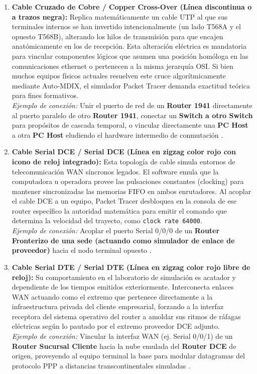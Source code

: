 \documentclass[a4paper,12pt]{article}
\begin{document}
\begin{enumerate}
    \item \textbf{Cable Cruzado de Cobre / Copper Cross-Over (Línea discontinua o a trazos negra):}
    Replica matemáticamente un cable UTP al que sus terminales internos se han invertido intencionalmente (un lado T568A y el opuesto T568B), alterando los hilos de transmisión para que encajen anatómicamente en los de recepción. Esta alteración eléctrica es mandatoria para vincular componentes lógicos que asumen una posición homóloga en las comunicaciones ethernet o pertenecen a la misma jerarquía OSI. Si bien muchos equipos físicos actuales resuelven este cruce algorítmicamente mediante Auto-MDIX, el simulador Packet Tracer demanda exactitud teórica para fines formativos. \\
    \textit{Ejemplo de conexión:} Unir el puerto de red de un \textbf{Router 1941} directamente al puerto paralelo de otro \textbf{Router 1941}, conectar un \textbf{Switch a otro Switch} para propósitos de cascada temporal, o vincular directamente una \textbf{PC Host} a otra \textbf{PC Host} eludiendo el hardware intermedio de conmutación \cite{packet_tracer_cables_guide, cisco_packet_tracer_video}.

    \item \textbf{Cable Serial DCE / Serial DCE (Línea en zigzag color rojo con icono de reloj integrado):}
    Esta topología de cable simula entornos de telecomunicación WAN síncronos legados. El software emula que la computadora u operadora provee las pulsaciones constantes (clocking) para mantener sincronizadas las memorias FIFO en ambos enrutadores. Al acoplar el cable DCE a un equipo, Packet Tracer desbloquea en la consola de ese router específico la autoridad matemática para emitir el comando que determina la velocidad del trayecto, como \texttt{clock rate 64000}. \\
    \textit{Ejemplo de conexión:} Acoplar el puerto Serial 0/0/0 de un \textbf{Router Fronterizo de una sede (actuando como simulador de enlace de proveedor)} hacia el nodo terminal opuesto \cite{dte_dce_packet_tracer}.

    \item \textbf{Cable Serial DTE / Serial DTE (Línea en zigzag color rojo libre de reloj):}
    Su comportamiento en el laboratorio de simulación es acatador y dependiente de los tiempos emitidos exteriormente. Interconecta enlaces WAN actuando como el extremo que pertenece directamente a la infraestructura privada del cliente empresarial, forzando a la interfaz receptora del sistema operativo del router a amoldar sus ritmos de ráfagas eléctricas según lo pautado por el extremo proveedor DCE adjunto. \\
    \textit{Ejemplo de conexión:} Vincular la interfaz WAN (ej. Serial 0/0/1) de un \textbf{Router Sucursal Cliente} hacia la nube emulada del \textbf{Router DCE} de origen, proveyendo al equipo terminal la base para modular datagramas del protocolo PPP a distancias transcontinentales simuladas \cite{dte_dce_packet_tracer}.


\end{enumerate}
\end{document}
